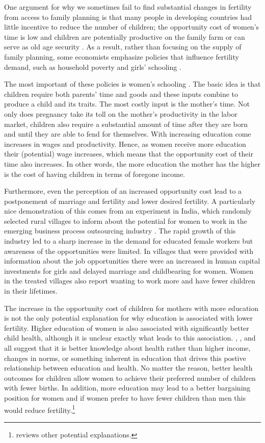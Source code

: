 One argument for why we sometimes fail to find substantial changes in fertility from access to family planning is that many people in developing countries had little incentive to reduce the number of children; the opportunity cost of women's time is low and children are potentially productive on the family farm or can serve as old age security \citep{Banerjee2014,Lambert2016}. As a result, rather than focusing on the supply of family planning, some economists emphasize policies that influence fertility demand, such as household poverty and girls' schooling \citep{pritchett94a,DasGupta2011}.

The most important of these policies is women's schooling \citep{schultz02}. The basic idea is that children require both parents' time and goods and these inputs combine to produce a child and its traits. The most costly input is the mother's time. Not only does pregnancy take its toll on the mother's productivity in the labor market, children also require a substantial amount of time after they are born and until they are able to fend for themselves. With increasing education come increases in wages and productivity. Hence, as women receive more education their (potential) wage increases, which means that the opportunity cost of their time also increases. In other words, the more education the mother has the higher is the cost of having children in terms of foregone income.

Furthermore, even the perception of an increased opportunity cost lead to a postponement of marriage and fertility and lower desired fertility. A particularly nice demonstration of this comes from an experiment in India, which randomly selected rural villages to inform about the potential for women to work in the emerging business process outsourcing industry \citep{Jensen2012}. The rapid growth of this industry led to a sharp increase in the demand for educated female workers but awareness of the opportunities were limited. In villages that were provided with information about the job opportunities there were an increased in human capital investments for girls and delayed marriage and childbearing for women. Women in the treated villages also report wanting to work more and have fewer children in their lifetimes.

The increase in the opportunity cost of children for mothers with more education is not the only potential explanation for why education is associated with lower fertility. Higher education of women is also associated with significantly better child health, although it is unclear exactly what leads to this association. \citet{Thomas1991}, \citet{Glewwe1999}, and \citet{Kovsted2002} all suggest that it is better knowledge about health rather than higher income, changes in norms, or something inherent in education that drives this postive relationship between education and health. No matter the reason, better health outcomes for children allow women to achieve their preferred number of children with fewer births. In addition, more education may lead to a better bargaining position for women and if women prefer to have fewer children than men this would reduce fertility.\footnote{\citet{Ainsworth1996} reviews other potential explanations.}


